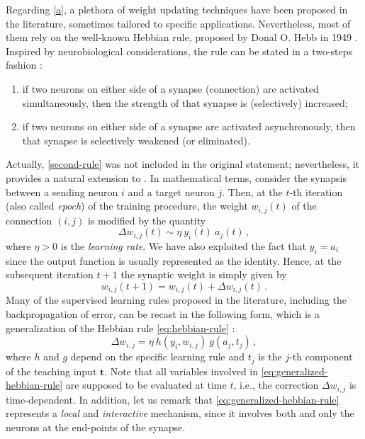 \documentclass[12pt, a4paper, twoside, openright, notitlepage]{report}
\numberwithin{equation}{chapter}
\theoremstyle{theorem}
\theoremstyle{definition}
\theoremstyle{remark}
\theoremstyle{proposition}
\numberwithin{figure}{chapter}
\begin{document}
		Regarding \ref{a}, a plethora of weight updating techniques have been proposed in the literature, sometimes tailored to specific applications. Nevertheless, most of them rely on the well-known Hebbian rule, proposed by Donal O. Hebb in 1949 \cite{Heb49}. Inspired by neurobiological considerations, the rule can be stated in a two-steps fashion \cite{Hay05}:
		\begin{enumerate}[label=(\roman*)]
			\item if two neurons on either side of a synapse (connection) are activated simultaneously, then the strength of that synapse is (selectively) increased;
			\label{first-rule}
			\item if two neurons on either side of a synapse are activated asynchronously, then that synapse is selectively weakened (or eliminated).
			\label{second-rule}
		\end{enumerate}
		Actually, \ref{second-rule} was not included in the original statement; nevertheless, it provides a natural extension to \label{first-rule} \cite{Hay05}.
		In mathematical terms, consider the synapsis between a sending neuron $i$ and a target neuron $j$. Then, at the $t$-th iteration (also called \emph{epoch}) of the training procedure, the weight $w_{i,j}(t)$ of the connection $(i,j)$ is modified by the quantity
		\begin{equation}
			\label{eq:hebbian-rule}
			\Delta w_{i,j}(t) \sim \eta ~ y_i(t) ~ a_j(t) \, ,
		\end{equation}
		where $\eta > 0$ is the \emph{learning rate}. We have also exploited the fact that $y_i = a_i$ since the output function is usually represented as the identity. Hence, at the subsequent iteration $t+1$ the synaptic weight is simply given by
		\begin{equation*}
			\label{eq:weight-update}
			w_{i,j}(t+1) = w_{i,j}(t) + \Delta w_{i,j}(t) \, .
		\end{equation*}
		Many of the supervised learning rules proposed in the literature, including the backpropagation of error, can be recast in the following form, which is a generalization of the Hebbian rule \eqref{eq:hebbian-rule} \cite{Kri07}:
		\begin{equation}
			\label{eq:generalized-hebbian-rule}
			\Delta w_{i,j} = \eta ~ h(y_i,w_{i,j}) ~ g(a_j,t_j) \, ,
		\end{equation}
		where $h$ and $g$ depend on the specific learning rule and $t_j$ is the $j$-th component of the teaching input $\mathbf{t}$. Note that all variables involved in \eqref{eq:generalized-hebbian-rule} are supposed to be evaluated at time $t$, i.e., the correction $\Delta w_{i,j}$ is time-dependent. In addition, let us remark that \eqref{eq:generalized-hebbian-rule} represents a \emph{local} and \emph{interactive} mechanism, since it involves both and only the neurons at the end-points of the synapse.
		
\end{document}
